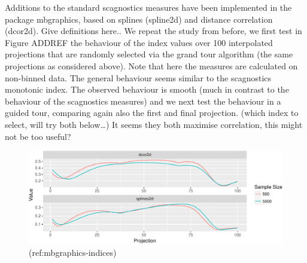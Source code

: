 \documentclass[article]{jss}
\begin{document}
Additions to the standard scagnostics measures have been implemented in
the package mbgraphics, based on splines (spline2d) and distance
correlation (dcor2d). Give definitions here.. We repeat the study from
before, we first test in Figure ADDREF the behaviour of the index values
over 100 interpolated projections that are randomly selected via the
grand tour algorithm (the same projections as considered above). Note
that here the measures are calculated on non-binned data. The general
behaviour seems similar to the scagnostics monotonic index. The observed
behaviour is smooth (much in contrast to the behaviour of the
scagnostics measures) and we next test the behaviour in a guided tour,
comparing again also the first and final projection. (which index to
select, will try both below\ldots{}) It seems they both maximise
correlation, this might not be too useful?

\begin{CodeChunk}
\begin{figure}

{\centering \includegraphics[width=\textwidth]{figure/mbgraphics-indices-1} 

}

\caption[(ref:mbgraphics-indices)]{(ref:mbgraphics-indices)}\label{fig:mbgraphics-indices}
\end{figure}
\end{CodeChunk}
\end{document}
